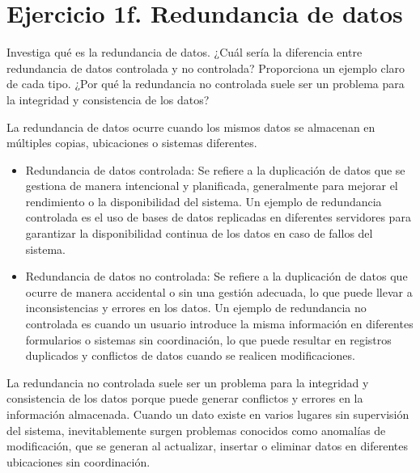 
\section*{Ejercicio 1f. Redundancia de datos}
Investiga qué es la redundancia de datos. ¿Cuál sería la diferencia entre redundancia de datos
controlada y no controlada? Proporciona un ejemplo claro de cada tipo. ¿Por qué la redundancia
no controlada suele ser un problema para la integridad y consistencia de los datos?

La redundancia de datos ocurre cuando los mismos datos se almacenan en múltiples copias, ubicaciones o sistemas diferentes.
\begin{itemize}
    \item Redundancia de datos controlada: Se refiere a la duplicación de datos que se gestiona de manera intencional y planificada, 
    generalmente para mejorar el rendimiento o la disponibilidad del sistema. Un ejemplo de redundancia controlada es el uso de bases de datos replicadas
    en diferentes servidores para garantizar la disponibilidad continua de los datos en caso de fallos del sistema.
    \item Redundancia de datos no controlada: Se refiere a la duplicación de datos que ocurre de manera accidental o sin una gestión adecuada, 
    lo que puede llevar a inconsistencias y errores en los datos. Un ejemplo de redundancia no controlada es cuando un usuario introduce la misma 
    información en diferentes formularios o sistemas sin coordinación, lo que puede resultar en registros duplicados y conflictos de datos cuando se realicen modificaciones.
\end{itemize}
La redundancia no controlada suele ser un problema para la integridad y consistencia de los datos porque puede generar conflictos y errores en la información almacenada.
Cuando un dato existe en varios lugares sin supervisión del sistema, inevitablemente surgen problemas conocidos como anomalías de modificación, que se generan al actualizar, insertar o eliminar datos en diferentes ubicaciones sin coordinación.



